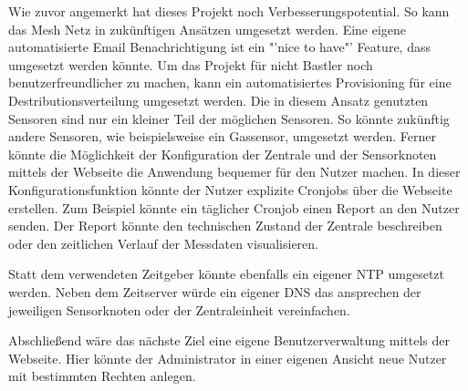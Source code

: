 	Wie zuvor angemerkt hat dieses Projekt noch Verbesserungspotential. So kann das Mesh Netz in zukünftigen Ansätzen umgesetzt werden. Eine eigene automatisierte Email Benachrichtigung ist ein "'nice to have"' Feature, dass umgesetzt werden könnte. Um das Projekt für nicht Bastler noch benutzerfreundlicher zu machen, kann ein automatisiertes Provisioning für eine Destributionsverteilung umgesetzt werden. Die in diesem Ansatz genutzten Sensoren sind nur ein kleiner Teil der möglichen Sensoren. So könnte zukünftig andere Sensoren, wie beispielsweise ein Gassensor, umgesetzt werden. Ferner könnte die Möglichkeit der Konfiguration der Zentrale und der Sensorknoten mittels der Webseite die Anwendung bequemer für den Nutzer machen. In dieser Konfigurationsfunktion könnte der Nutzer explizite Cronjobs über die Webseite erstellen. Zum Beispiel könnte ein täglicher Cronjob einen Report an den Nutzer senden. Der Report könnte den technischen Zustand der Zentrale beschreiben oder den zeitlichen Verlauf der Messdaten visualisieren.
	
	Statt dem verwendeten Zeitgeber könnte ebenfalls ein eigener \ac{NTP} umgesetzt werden. Neben dem Zeitserver würde ein eigener \ac{DNS} das ansprechen der jeweiligen Sensorknoten oder der Zentraleinheit vereinfachen.
	
	Abschließend wäre das nächste Ziel eine eigene Benutzerverwaltung mittels der Webseite. Hier könnte der Administrator in einer eigenen Ansicht neue Nutzer mit bestimmten Rechten anlegen.

